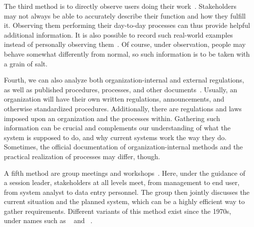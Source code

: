 The third method is to directly observe users doing their work~\cite{SGGM2007TMSPATFISRDWS,Z2003RDARS}.
Stakeholders may not always be able to accurately describe their function and how they fulfill it.
Observing them performing their day-to-day processes can thus provide helpful additional information.
It is also possible to record such real-world examples instead of personally observing them~\cite{HPW1998REAVWRWS}.
Of course, under observation, people may behave somewhat differently from normal, so such information is to be taken with a grain of salt.

Fourth, we can also analyze both organization-internal and external regulations, as well as published procedures, processes, and other documents~\cite{RGJ2023EASARBFSAR,Z2003RDARS}.
Usually, an organization will have their own written regulations, announcements, and otherwise standardized procedures.
Additionally, there are regulations and laws imposed upon an organization and the processes within.
Gathering such information can be crucial and complements our understanding of what the system is supposed to do, and why current systems work the way they do.
Sometimes, the official documentation of organization-internal methods and the practical realization of processes may differ, though.

A fifth method are group meetings and workshops~\cite{Z2003RDARS}.
Here, under the guidance of a session leader, stakeholders at all levels meet, from management to end user, from system analyst to data entry personnel.
The group then jointly discusses the current situation and the planned system, which can be a highly efficient way to gather requirements.
Different variants of this method exist since the 1970s, under names such as ~\cite{CWG1993PAJADATC,M1996RTWSS} and ~\cite{CWG1993PAJADATC,FMRSW1989OOSAATSDASD}.

